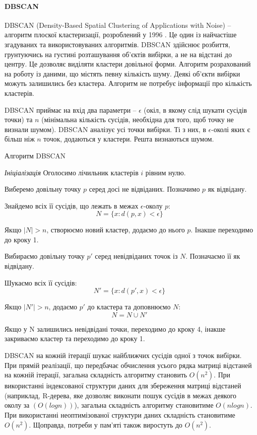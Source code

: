     \paragraph {DBSCAN}
    
    DBSCAN (Density-Based Spatial Clustering of Applications with Noise) -- алгоритм плоскої кластеризації, розроблений у 1996 \cite{DBSCAN}. Це один із найчастіше згадуваних та використовуваних алгоритмів. DBSCAN здійснює розбиття, грунтуючись на густині розташування об'єктів вибірки, а не на відстані до центру. Це дозволяє виділяти кластери довільної форми. Алгоритм розрахований на роботу із даними, що містять певну кількість шуму. Деякі об'єкти вибірки можуть залишились без кластера. Алгоритм не потребує інформації про кількість кластерів.
    
    DBSCAN приймає на вхід два параметри -- $\epsilon$ (окіл, в якому слід шукати сусідів точки) та $n$ (мінімальна кількість сусідів, необхідна для того, щоб точку не визнали шумом). DBSCAN аналізує усі точки вибірки. Ті з них, в $\epsilon$-околі яких є більш ніж $n$ точок, додаються у кластери. Решта визнаються шумом.
    
    \begin{algorithm}
        \caption{Алгоритм DBSCAN}
        \enumerate
            \item [] \emph{Ініціалізація} Оголосимо лічильник кластерів $i$ рівним нулю.
            \item Виберемо довільну точку $p$ серед досі не відвіданих. Позначимо $p$ як відвідану.
            \item Знайдемо всіх її сусідів, що лежать в межах $\epsilon$-околу $p$:
                \[
                    N = \{x : d(p, x) < \epsilon\}
                \]
            \item Якщо $\mid N \mid > n$, створюємо новий кластер, додаємо до нього $p$. Інакше переходимо до кроку 1.
            \item Вибираємо довільну точку $p'$ серед невідвіданих точок із $N$. Позначаємо її як відвідану.
            \item Шукаємо всіх її сусідів:
                \[
                    N' = \{x : d(p', x) < \epsilon\}
                \]
            \item Якщо $\mid N' \mid > n$, додаємо $p'$ до кластера та доповнюємо $N$:
                \[
                    N = N \cup N'
                \]
            \item Якщо у N залишились невідвідані точки, переходимо до кроку 4, інакше закриваємо кластер та переходимо до кроку 1.
    \end{algorithm}
    
    DBSCAN на кожній ітерації шукає найближчих сусідів одної з точок вибірки. При прямій реалізації, що передбачає обчислення усього рядка матриці відстаней на кожній ітерації, загальна складність алгоритму становить $O(n^2)$. При використанні індексованої структури даних для збереження матриці відстаней (наприклад, R-дерева, яке дозволяє виконати пошук сусідів в межах деякого околу за $(O(log n))$), загальна складність алгоритму становитиме $O(n log n)$. При використанні неоптимізованої структури даних складність становитиме $O(n^2)$. Щоправда, потреби у пам'яті також виростуть до $O(n^2)$.
